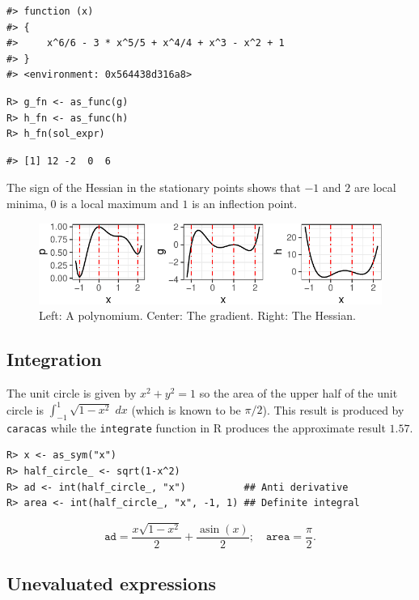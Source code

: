 \begin{verbatim}
#> function (x) 
#> {
#>     x^6/6 - 3 * x^5/5 + x^4/4 + x^3 - x^2 + 1
#> }
#> <environment: 0x564438d316a8>
\end{verbatim}

\begin{verbatim}
R> g_fn <- as_func(g)
R> h_fn <- as_func(h)
R> h_fn(sol_expr)
\end{verbatim}

\begin{verbatim}
#> [1] 12 -2  0  6
\end{verbatim}

The sign of the Hessian in the stationary points shows that \(-1\) and
\(2\) are local minima, \(0\) is a local maximum and \(1\) is an inflection
point.

\begin{figure}
\centering
\includegraphics{calculus-1.pdf}
\caption{\label{fig:calculus}Left: A polynomium. Center: The gradient. Right: The Hessian.}
\end{figure}

\hypertarget{integration}{%
\subsection{Integration}\label{integration}}

The unit circle is given by \(x^2 + y^2 = 1\) so the area of the upper
half of the unit circle is \(\int_{-1}^1 \sqrt{1-x^2}\; dx\) (which is
known to be \(\pi/2\)). This result is produced by \texttt{caracas} while the
\texttt{integrate} function in R produces the approximate result \(1.57\).

\begin{verbatim}
R> x <- as_sym("x")
R> half_circle_ <- sqrt(1-x^2)
R> ad <- int(half_circle_, "x")          ## Anti derivative
R> area <- int(half_circle_, "x", -1, 1) ## Definite integral
\end{verbatim}

\[
\texttt{ad} = \frac{x \sqrt{1 - x^{2}}}{2} + \frac{\operatorname{asin}{\left(x \right)}}{2}; \quad
\texttt{area} = \frac{\pi}{2}.
\]

\hypertarget{unevaluated-expressions}{%
\subsection{Unevaluated expressions}\label{unevaluated-expressions}}

